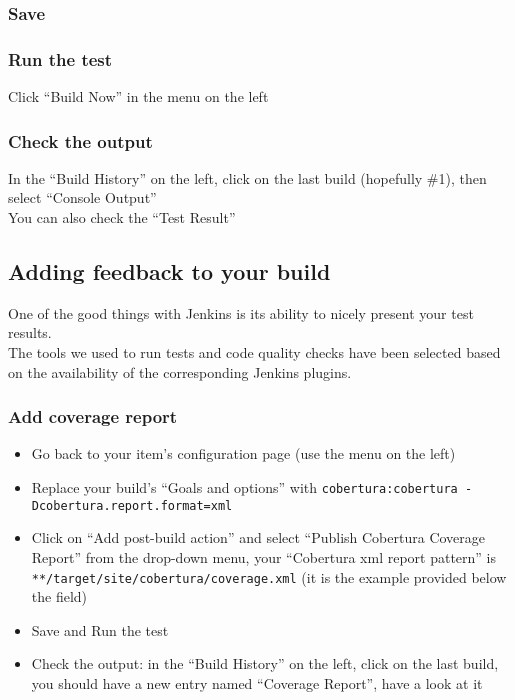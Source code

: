 \documentclass{article}
\begin{document}
\subsubsection{Save}

\subsubsection{Run the test}
Click ``Build Now'' in the menu on the left

\subsubsection{Check the output}
In the ``Build History'' on the left, click on the last build (hopefully \#1), then select ``Console Output'' \\
You can also check the ``Test Result''

\subsection{Adding feedback to your build}
One of the good things with Jenkins is its ability to nicely present your test results. \\
The tools we used to run tests and code quality checks have been selected based on the availability of the corresponding Jenkins plugins.

\subsubsection{Add coverage report}
\begin{itemize}
\item Go back to your item's configuration page (use the menu on the left)
\item Replace your build's ``Goals and options'' with \texttt{cobertura:cobertura -Dcobertura.report.format=xml}
\item Click on ``Add post-build action'' and select ``Publish Cobertura Coverage Report'' from the drop-down menu, your ``Cobertura xml report pattern'' is \texttt{**/target/site/cobertura/coverage.xml} (it is the example provided below the field)
\item Save and Run the test
\item Check the output: in the ``Build History'' on the left, click on the last build, you should have a new entry named ``Coverage Report'', have a look at it
\end{itemize}
\end{document}
